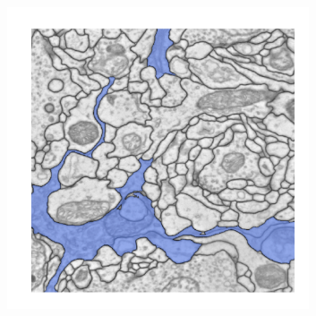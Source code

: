 

\begin{figure}
\centering
        \begin{subfigure}[t]{0.46 \linewidth}
        \centering
        \includegraphics[width=0.98\textwidth]{figs/comparison/sum_F.pdf}
    \end{subfigure}%
    \begin{subfigure}[t]{0.46 \linewidth}
        \centering

\end{subfigure}
\end{figure}
